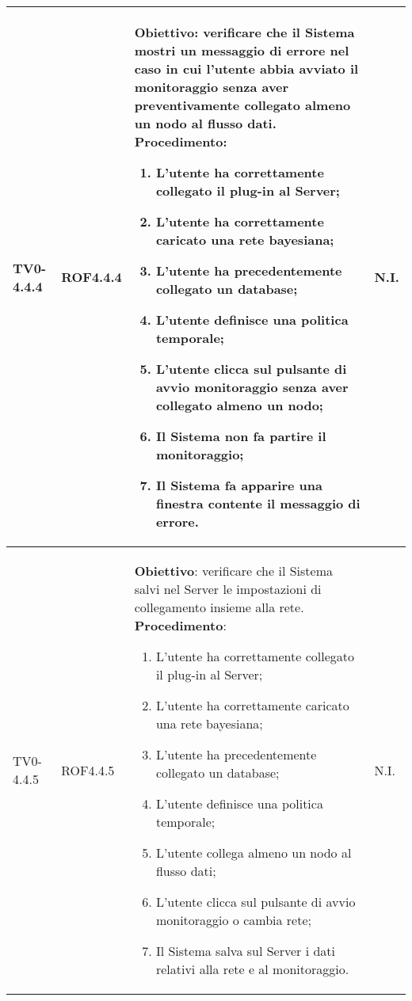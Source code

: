 \begin{longtable}{|C{.15\textwidth}|C{.13\textwidth}|m{.52\textwidth}|C{.08\textwidth}|}
TV0-4.4.4 & ROF4.4.4 &
	\textbf{Obiettivo}: verificare che il Sistema mostri un messaggio di errore nel caso in cui l'utente abbia avviato il monitoraggio senza aver preventivamente  collegato almeno un nodo al flusso dati. \newline
	\textbf{Procedimento}:
	\begin{enumerate}
		\item L'utente ha correttamente collegato il plug-in al Server;
		\item L'utente ha correttamente caricato una rete bayesiana;
		\item L'utente ha precedentemente collegato un database;
		\item L'utente definisce una politica temporale;
		\item L'utente clicca sul pulsante di avvio monitoraggio senza aver collegato almeno un nodo;
		\item Il Sistema non fa partire il monitoraggio;
		\item Il Sistema fa apparire una finestra contente il messaggio di errore.
	\end{enumerate}
	& N.I. \\
\hline

TV0-4.4.5 & ROF4.4.5 &
	\textbf{Obiettivo}: verificare che il Sistema salvi nel Server le impostazioni di collegamento insieme alla rete. \newline
	\textbf{Procedimento}:
	\begin{enumerate}
		\item L'utente ha correttamente collegato il plug-in al Server;
		\item L'utente ha correttamente caricato una rete bayesiana;
		\item L'utente ha precedentemente collegato un database;
		\item L'utente definisce una politica temporale;
		\item L'utente collega almeno un nodo al flusso dati;
		\item L'utente clicca sul pulsante di avvio monitoraggio o cambia rete;
		\item Il Sistema salva sul Server i dati relativi alla rete e al monitoraggio.	
	\end{enumerate}
	& N.I. \\
\hline


\end{longtable}
